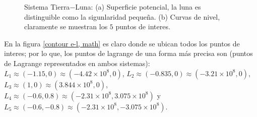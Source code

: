\begin{figure}[H]
\centering
{} \qquad \qquad
{}
\caption{Sistema Tierra$-$Luna: (a) Superficie potencial, la luna es distinguible como la sigunlaridad pequeña. (b) Curvas de nivel, claramente se muestran los $5$ puntos de interes.}
\label{superficie, cn e-l, math}
\end{figure}

En la figura \ref{contour e-l, math} es claro donde se ubican todos los puntos de interes; por lo que, los puntos de lagrange de una forma más precisa son (puntos de Lagrange representados en ambos sistemas): $L_1 \approx (-1.15,0) \approx (-4.42\times 10^{8} ,0)$, $L_2 \approx (-0.835,0) \approx (-3.21\times 10^{8} ,0)$, $L_3 \approx (1,0) \approx (3.844\times 10^{8} ,0)$, $L_4 \approx (-0.6,0.8) \approx (-2.31\times 10^{8} ,3.075\times 10^{8})$ y $L_5 \approx (-0.6,-0.8) \approx (-2.31\times 10^{8} ,-3.075\times 10^{8})$. \\

